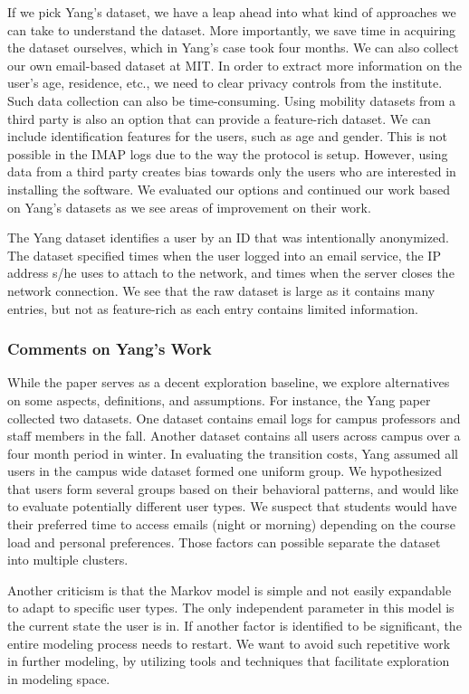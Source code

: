 \documentclass[]{article}
\begin{document}
If we pick Yang's dataset, we have a leap ahead into what kind of approaches we can take to understand the dataset. More importantly, we save time in acquiring the dataset ourselves, which in Yang's case took four months. We can also collect our own email-based dataset at MIT. In order to extract more information on the user's age, residence, etc., we need to clear privacy controls from the institute. Such data collection can also be time-consuming. Using mobility datasets from a third party is also an option that can provide a feature-rich dataset. We can include identification features for the users, such as age and gender. This is not possible in the IMAP logs due to the way the protocol is setup. However, using data from a third party creates bias towards only the users who are interested in installing the software. We evaluated our options and continued our work based on Yang's datasets as we see areas of improvement on their work.

The Yang dataset identifies a user by an ID that was intentionally anonymized. The dataset specified times when the user logged into an email service, the IP address s/he uses to attach to the network, and times when the server closes the network connection. We see that the raw dataset is large as it contains many entries, but not as feature-rich as each entry contains limited information.

\subsubsection{Comments on Yang's Work}

While the paper serves as a decent exploration baseline, we explore alternatives on some aspects, definitions, and assumptions. For instance, the Yang paper collected two datasets. One dataset contains email logs for campus professors and staff members in the fall. Another dataset contains all users across campus over a four month period in winter.  In evaluating the transition costs, Yang assumed all users in the campus wide dataset formed one uniform group. We hypothesized that users form several groups based on their behavioral patterns, and would like to evaluate potentially different user types. We suspect that students would have their preferred time to access emails (night or morning) depending on the course load and personal preferences. Those factors can possible separate the dataset into multiple clusters. 

Another criticism is that the Markov model is simple and not easily expandable to adapt to specific user types. The only independent parameter in this model is the current state the user is in. If another factor is identified to be significant, the entire modeling process needs to restart. We want to avoid such repetitive work in further modeling, by utilizing tools and techniques that facilitate exploration in modeling space.
\end{document}
